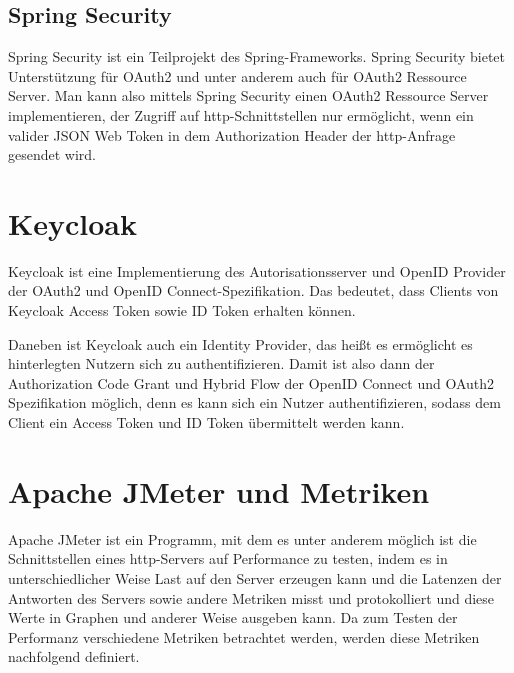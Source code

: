 \subsection{Spring Security}
Spring Security ist ein Teilprojekt des Spring-Frameworks. Spring Security bietet 
Unterstützung für OAuth2 und unter anderem auch für OAuth2 Ressource Server. 
Man kann also mittels Spring Security einen OAuth2 Ressource Server implementieren, der 
Zugriff auf http-Schnittstellen nur ermöglicht, wenn ein valider JSON Web Token in dem 
Authorization Header der http-Anfrage gesendet wird. 

\section{Keycloak}
Keycloak ist eine Implementierung des Autorisationsserver und OpenID Provider der 
OAuth2 und OpenID Connect-Spezifikation. Das bedeutet, dass Clients von Keycloak Access 
Token sowie ID Token erhalten können.\smallskip

Daneben ist Keycloak auch ein Identity Provider, das heißt es ermöglicht es hinterlegten 
Nutzern sich zu authentifizieren. Damit ist also dann der Authorization Code Grant und 
Hybrid Flow der OpenID Connect und OAuth2 Spezifikation möglich, denn es kann sich ein 
Nutzer authentifizieren, sodass dem Client ein Access Token und ID Token übermittelt 
werden kann.

\section{Apache JMeter und Metriken}
\label{sec:ApacheJMeterundMetriken}
Apache JMeter ist ein Programm, mit dem es unter anderem möglich ist die Schnittstellen eines http-Servers auf 
Performance zu testen, indem es in unterschiedlicher Weise Last auf den Server erzeugen 
kann und die Latenzen der Antworten des Servers sowie andere Metriken misst und 
protokolliert und diese Werte in Graphen und anderer Weise ausgeben kann.
Da zum Testen der Performanz verschiedene Metriken betrachtet werden, werden diese 
Metriken nachfolgend definiert. 

